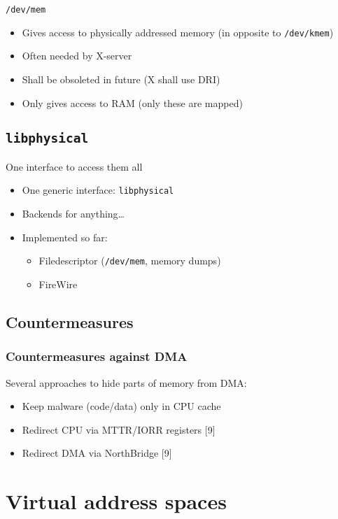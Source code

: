 \documentclass{beamer}
\newenvironment{itemizeframe}[1]
  {\begin{frame}{#1}\startitemizeframe}
  {\stopitemizeframe\end{frame}}
\newcommand\startitemizeframe{\begin{itemize}}
\newcommand\stopitemizeframe{\end{itemize}}
\begin{document}
		\begin{itemizeframe}{\texttt{/dev/mem}}
			\item Gives access to physically addressed memory (in opposite to \texttt{/dev/kmem})
			\item Often needed by X-server
			\item Shall be obsoleted in future (X shall use DRI)
			\item Only gives access to  RAM (only these are mapped)
		\end{itemizeframe}

	\subsection{\texttt{libphysical}}

		\begin{itemizeframe}{One interface to access them all}
			\item One generic interface: \texttt{libphysical}
			\item Backends for anything\ldots
			\item Implemented so far:
			\begin{itemize}
				\item Filedescriptor (\texttt{/dev/mem}, memory dumps)
				\item FireWire
			\end{itemize}
		\end{itemizeframe}

	\subsection{Countermeasures}
		
		\begin{frame} \frametitle{Countermeasures against DMA}
			Several approaches to hide parts of memory from DMA:

			\begin{itemize}
				\item Keep malware (code/data) only in CPU cache
				\item Redirect CPU via MTTR/IORR registers [9]
				\item Redirect DMA via NorthBridge [9]
			\end{itemize}

		\end{frame}

\section{Virtual address spaces}
\end{document}
